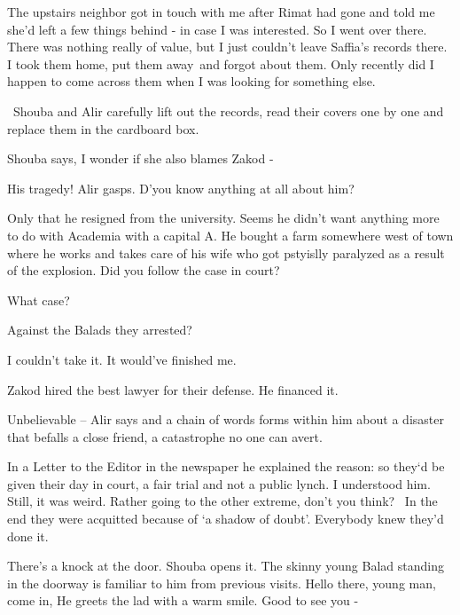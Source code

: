 \documentclass[12pt]{book}
\begin{document}
{\textquotedbl}The upstairs neighbor got in touch with me after Rimat had gone and told me she'd left a few things
behind - in case I was interested. So I went over there. There was nothing really of value, but I just couldn't leave
Saffia's records there. I took them home, put them away~and forgot about them. Only recently did I happen to come
across them when I was looking for something else.{\textquotedbl}

~Shouba and Alir carefully lift out the records, read their covers one by one and replace them in the cardboard box.

Shouba says, {\textquotedbl}I wonder if she also blames Zakod -{\textquotedbl}

{\textquotedbl}His tragedy!{\textquotedbl} Alir gasps. {\textquotedbl}D'you know anything at all about
him?{\textquotedbl}

{\textquotedbl}Only that he resigned from the university. Seems he didn't want anything more to do with Academia with a
capital A. He bought a farm somewhere west of town where he works and takes care of his wife who got pstyislly
paralyzed as a result of the explosion. Did you follow the case in court?{\textquotedbl}

{\textquotedbl}What case?{\textquotedbl}

{\textquotedbl}Against the Balads they arrested?{\textquotedbl}

{\textquotedbl}I couldn't take it. It would've finished me.{\textquotedbl}

{\textquotedbl}Zakod hired the best lawyer for their defense. He financed it.{\textquotedbl}

{\textquotedbl}Unbelievable --{\textquotedbl} Alir says and a chain of words forms within him about a disaster that
befalls a close friend, a catastrophe no one can avert.

{\textquotedbl}In a Letter to the Editor in the newspaper he explained the reason: so they`d be given their day in
court, a fair trial and not a public lynch. I understood him. Still, it was weird. Rather going to the other extreme,
don't you think?{ \ }In the end they were acquitted because of `a shadow of
doubt'. Everybody knew they'd done it.{\textquotedbl}

There's a knock at the door. Shouba opens it. The skinny young Balad standing in the doorway is familiar to him from
previous visits. {\textquotedbl}Hello there, young man, come in,{\textquotedbl} He greets the lad with a warm smile.
{\textquotedbl}Good to see you -{\textquotedbl}
\end{document}

